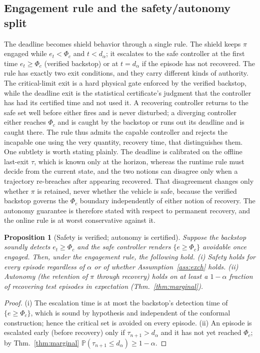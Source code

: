 \documentclass[11pt]{article}
\theoremstyle{plain}
\newtheorem{proposition}{Proposition}
\theoremstyle{definition}
\newcommand{\Prob}{\mathbb{P}}
\newcommand{\dalpha}{d_{\alpha}}
\begin{document}
\subsection{Engagement rule and the safety/autonomy split} The deadline becomes shield
behavior through a single rule. The shield keeps $\pi$ engaged
while $e_t<\Phi_c$ and $t<\dalpha$; it escalates to the safe controller at the first time
$e_t\ge\Phi_c$ (verified backstop) or at $t=\dalpha$ if the episode has not recovered. The
rule has exactly two exit conditions, and they carry different kinds of authority. The
critical-limit exit is a hard physical gate enforced by the verified backstop, while the
deadline exit is the statistical certificate's judgment that the controller has had its
certified time and not used it. A recovering controller returns to the safe set well before
either fires and is never disturbed; a diverging controller either reaches $\Phi_c$ and is
caught by the backstop or runs out its deadline and is caught there. The rule thus admits the
capable controller and rejects the incapable one using the very quantity, recovery time, that
distinguishes them. One subtlety is
worth stating plainly. The deadline is calibrated on the offline last-exit $\tau$, which is
known only at the horizon, whereas the runtime rule must decide from the current state, and
the two notions can disagree only when a trajectory re-breaches after appearing recovered.
That disagreement changes only whether $\pi$ is retained, never whether the vehicle is safe,
because the verified backstop governs the $\Phi_c$ boundary independently of either notion of
recovery. The autonomy guarantee is therefore stated with respect to permanent recovery,
and the online rule is at worst conservative against it.

\begin{proposition}[Safety is verified; autonomy is certified]
\label{prop:safety}
Suppose the backstop soundly detects $e_t\ge\Phi_c$ and the safe controller renders
$\{e\ge\Phi_c\}$ avoidable once engaged. Then, under the engagement rule, the following hold.
(i) \emph{Safety} holds for \emph{every} episode regardless of $\alpha$ or of whether
Assumption~\ref{ass:exch} holds. (ii) \emph{Autonomy} (the retention of $\pi$ through
recovery) holds on at least a $1-\alpha$ fraction of recovering test episodes in
expectation (Thm.~\ref{thm:marginal}).
\end{proposition}
\begin{proof}
(i) The escalation time is at most the backstop's detection time of $\{e\ge\Phi_c\}$, which
is sound by hypothesis and independent of the conformal construction; hence the critical set
is avoided on every episode. (ii) An episode is escalated early (before recovery) only if
$\tau_{n+1}>\dalpha$ and it has not yet reached $\Phi_c$; by Thm.~\ref{thm:marginal}
$\Prob(\tau_{n+1}\le\dalpha)\ge1-\alpha$.
\end{proof}
\end{document}
